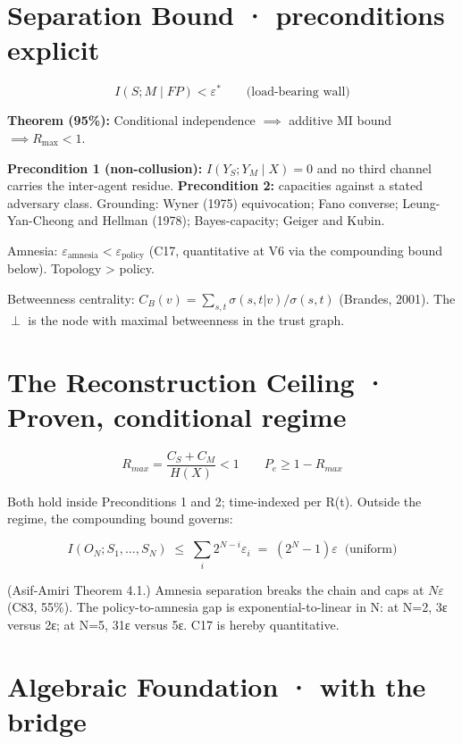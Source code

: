 \documentclass[
  11pt,
]{article}
\begin{document}
\section{Separation Bound · preconditions
explicit}\label{separation-bound-preconditions-explicit}

\[I(S; M \mid FP) < \varepsilon^* \qquad \text{(load-bearing wall)}\]

\textbf{Theorem (95\%):} Conditional independence \(\implies\) additive
MI bound \(\implies R_{\max} < 1\).

\textbf{Precondition 1 (non-collusion):} \(I(Y_S; Y_M \mid X) = 0\) and
no third channel carries the inter-agent residue. \textbf{Precondition
2:} capacities against a stated adversary class. Grounding: Wyner (1975)
equivocation; Fano converse; Leung-Yan-Cheong and Hellman (1978);
Bayes-capacity; Geiger and Kubin.

Amnesia: \(\varepsilon_{\text{amnesia}} < \varepsilon_{\text{policy}}\)
(C17, quantitative at V6 via the compounding bound below). Topology
\textgreater{} policy.

Betweenness centrality:
\(C_B(v) = \sum_{s,t} \sigma(s,t|v)/\sigma(s,t)\) (Brandes, 2001). The
\(\perp\) is the node with maximal betweenness in the trust graph.

\section{The Reconstruction Ceiling · Proven, conditional
regime}\label{the-reconstruction-ceiling-proven-conditional-regime}

\[R_{max} = \frac{C_S + C_M}{H(X)} < 1 \qquad P_e \geq 1 - R_{max}\]

Both hold inside Preconditions 1 and 2; time-indexed per R(t). Outside
the regime, the compounding bound governs:

\[I(O_N; S_1, \dots, S_N) \;\leq\; \sum_{i} 2^{N-i}\varepsilon_i \;=\; (2^N - 1)\varepsilon \;\;\text{(uniform)}\]

(Asif-Amiri Theorem 4.1.) Amnesia separation breaks the chain and caps
at \(N\varepsilon\) (C83, 55\%). The policy-to-amnesia gap is
exponential-to-linear in N: at N=2, 3ε versus 2ε; at N=5, 31ε versus 5ε.
C17 is hereby quantitative.

\section{Algebraic Foundation · with the
bridge}\label{algebraic-foundation-with-the-bridge}
\end{document}

